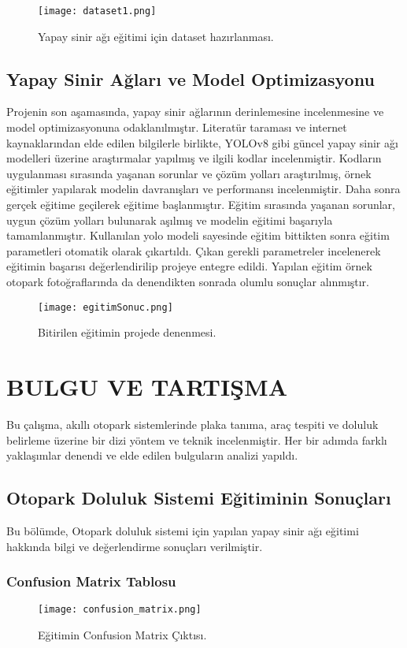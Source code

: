 \documentclass[]{article}
\begin{document}
	\begin{figure}[!ht]
		\centering
		\texttt{[image: dataset1.png]}
		\caption{Yapay sinir ağı eğitimi için dataset hazırlanması.}
	\end{figure}
	\newpage
	\subsection{Yapay Sinir Ağları ve Model Optimizasyonu}
	Projenin son aşamasında, yapay sinir ağlarının derinlemesine incelenmesine ve model optimizasyonuna odaklanılmıştır. Literatür taraması ve internet kaynaklarından elde edilen bilgilerle birlikte, YOLOv8 gibi güncel yapay sinir ağı modelleri üzerine araştırmalar yapılmış ve ilgili kodlar incelenmiştir. Kodların uygulanması sırasında yaşanan sorunlar ve çözüm yolları araştırılmış, örnek eğitimler yapılarak modelin davranışları ve performansı incelenmiştir\cite{kod2}. Daha sonra gerçek eğitime geçilerek eğitime başlanmıştır\cite{yapayZekaKod}. Eğitim sırasında yaşanan sorunlar, uygun çözüm yolları bulunarak aşılmış ve modelin eğitimi başarıyla tamamlanmıştır. Kullanılan yolo modeli sayesinde eğitim bittikten sonra eğitim parametleri otomatik olarak çıkartıldı. Çıkan gerekli parametreler incelenerek eğitimin başarısı değerlendirilip projeye entegre edildi. Yapılan eğitim örnek otopark fotoğraflarında da denendikten sonrada olumlu sonuçlar alınmıştır.
	\begin{figure}[!ht]
		\centering
		\texttt{[image: egitimSonuc.png]}
		\caption{Bitirilen eğitimin projede denenmesi.}
	\end{figure}
	\newpage
	\section{BULGU VE TARTIŞMA}
	Bu çalışma, akıllı otopark sistemlerinde plaka tanıma, araç tespiti ve doluluk belirleme üzerine bir dizi yöntem ve teknik incelenmiştir. Her bir adımda farklı yaklaşımlar denendi ve elde edilen bulguların analizi yapıldı.
	\subsection{Otopark Doluluk Sistemi Eğitiminin Sonuçları}
	Bu bölümde, Otopark doluluk sistemi için yapılan yapay sinir ağı eğitimi hakkında bilgi ve değerlendirme sonuçları verilmiştir.
	
	\subsubsection{Confusion Matrix Tablosu}
		\begin{figure}[!ht]
			\centering
			\texttt{[image: confusion\_matrix.png]}
			\caption{Eğitimin Confusion Matrix Çıktısı.}
			
		\end{figure}
\end{document}
